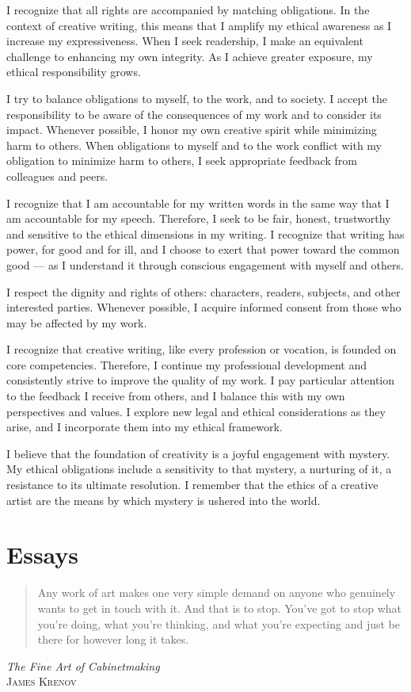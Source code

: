 \documentclass[letterpaper,oneside]{memoir}
\begin{document}
\begin{description}
I recognize that all rights are accompanied by matching obligations. In the context of creative writing, this means that I amplify my ethical awareness as I increase my expressiveness. When I seek readership, I make an equivalent challenge to enhancing my own integrity. As I achieve greater exposure, my ethical responsibility grows.

I try to balance obligations to myself, to the work, and to society. I accept the responsibility to be aware of the consequences of my work and to consider its impact. Whenever possible, I honor my own creative spirit while minimizing harm to others. When obligations to myself and to the work conflict with my obligation to minimize harm to others, I seek appropriate feedback from colleagues and peers.

I recognize that I am accountable for my written words in the same way that I am accountable for my speech. Therefore, I seek to be fair, honest, trustworthy and sensitive to the ethical dimensions in my writing. I recognize that writing has power, for good and for ill, and I choose to exert that power toward the common good --- as I understand it through conscious engagement with myself and others.

I respect the dignity and rights of others: characters, readers, subjects, and other interested parties. Whenever possible, I acquire informed consent from those who may be affected by my work.

I recognize that creative writing, like every profession or vocation, is founded on core competencies. Therefore, I continue my professional development and consistently strive to improve the quality of my work. I pay particular attention to the feedback I receive from others, and I balance this with my own perspectives and values. I explore new legal and ethical considerations as they arise, and I incorporate them into my ethical framework.

I believe that the foundation of creativity is a joyful engagement with mystery. My ethical obligations include a sensitivity to that mystery, a nurturing of it, a resistance to its ultimate resolution. I remember that the ethics of a creative artist are the means by which mystery is ushered into the world.
\chapter{Essays}
\begin{quotation}
Any work of art makes one very simple demand on anyone who genuinely wants to get in touch with it. And that is to stop. You've got to stop what you're doing, what you're thinking, and what you're expecting and just be there for however long it takes. 
\end{quotation}
{\textit{The Fine Art of Cabinetmaking} \\
  \textsc{James Krenov}}
\newpage
\vspace*{5cm}

\end{description}
\end{document}
